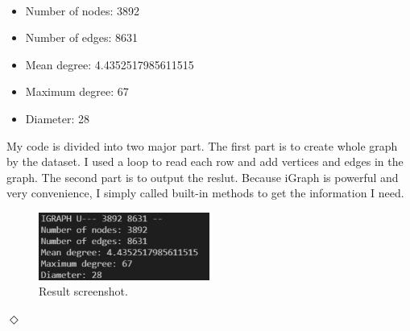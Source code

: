 \documentclass[12pt]{article}
\newcommand {\bsolution}{\noindent {\em Solution:} \ }
\newcommand{\esolution}{\hfill $\Diamond$ \\ \vspace{.3cm}}
\begin{document}
\bsolution
\begin{itemize}
	\item Number of nodes: 3892
	\item Number of edges: 8631
	\item Mean degree: 4.4352517985611515
	\item Maximum degree: 67
	\item Diameter: 28
\end{itemize}
My code is divided into two major part. The first part is to create whole graph by the dataset. I used a loop to read each row and add vertices and edges in the graph. The second part is to output the reslut. Because iGraph is powerful and very convenience, I simply called built-in methods to get the information I need. 
\begin{figure}[h]
	\centering
	\includegraphics[width=0.5\textwidth]{fig-prob6.png}
	\caption{Result screenshot.}
	\label{HW1_6}
\end{figure}
\esolution

\end{document}
